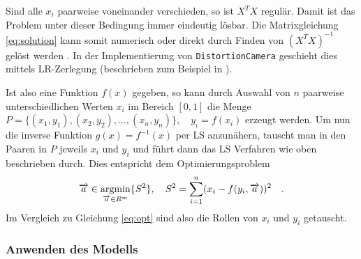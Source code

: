 Sind alle $x_i$ paarweise voneinander verschieden, so ist $X^T X$ regulär. Damit ist das Problem unter dieser Bedingung immer eindeutig lösbar. Die Matrixgleichung \ref{eq:solution} kann somit numerisch oder direkt durch Finden von $(X^T X)^{-1}$ gelöst werden \cite{lsq_poly_wolfram}. In der Implementierung von \texttt{DistortionCamera} geschieht dies mittels LR-Zerlegung (beschrieben zum Beispiel in \cite{bronstein}).

Ist also eine Funktion $f(x)$ gegeben, so kann durch Auswahl von $n$ paarweise unterschiedlichen Werten $x_i$ im Bereich $[0,1]$ die Menge $P = \{ (x_1, y_1), (x_2, y_2), \dots, (x_n, y_n) \}, \quad y_i = f(x_i)$ erzeugt werden. Um nun die inverse Funktion $g(x) = f^{-1}(x)$ per LS anzunähern, tauscht man in den Paaren in $P$ jeweils $x_i$ und $y_i$ und führt dann das LS Verfahren wie oben beschrieben durch. Dies entspricht dem Optimierungsproblem
\begin{equation}
\begin{split}
\overrightarrow{a} \in \mathop{\mathrm{argmin}}_{\overrightarrow{a} \in R^m} \{ S^2 \}, \quad
S^2 =  \sum_{i=1}^{n} (x_i - f(y_i, \overrightarrow{a}))^2\quad.
\end{split}
\end{equation}
Im Vergleich zu Gleichung \ref{eq:opt} sind also die Rollen von $x_i$ und $y_i$ getauscht.

\subsubsection{Anwenden des Modells}
\label{subsubsec:anwenden}

